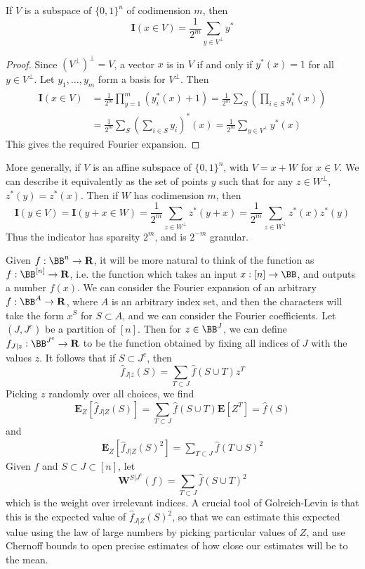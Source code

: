 \begin{theorem}
    If $V$ is a subspace of $\{ 0, 1 \}^n$ of codimension $m$, then
    \[ \mathbf{I}(x \in V) = \frac{1}{2^m} \sum_{y \in V^\perp} y^* \]
\end{theorem}
\begin{proof}
    Since $(V^\perp)^\perp = V$, a vector $x$ is in $V$ if and only if $y^*(x) = 1$ for all $y \in V^\perp$. Let $y_1, \dots, y_m$ form a basis for $V^\perp$. Then
    \begin{align*}
        \mathbf{I}(x \in V) &= \frac{1}{2^m} \prod_{y = 1}^m \left( y_i^*(x) + 1 \right) = \frac{1}{2^m} \sum_S \left( \prod_{i \in S} y_i^*(x) \right)\\
        &= \frac{1}{2^m} \sum_S \left( \sum_{i \in S} y_i \right)^*(x) = \frac{1}{2^m} \sum_{y \in V^\perp} y^*(x)
    \end{align*}
    This gives the required Fourier expansion.
\end{proof}

More generally, if $V$ is an affine subspace of $\{ 0, 1 \}^n$, with $V = x + W$ for $x \in V$. We can describe it equivalently as the set of points $y$ such that for any $z \in W^\perp$, $z^*(y) = z^*(x)$. Then if $W$ has codimension $m$, then
%
\[ \mathbf{I}(y \in V) = \mathbf{I}(y + x \in W) = \frac{1}{2^m} \sum_{z \in W^\perp} z^*(y + x) = \frac{1}{2^m} \sum_{z \in W^\perp} z^*(x) z^*(y) \]
%
Thus the indicator has sparsity $2^m$, and is $2^{-m}$ granular.

Given $f: \BB^n \to \mathbf{R}$, it will be more natural to think of the function as $f: \BB^{[n]} \to \mathbf{R}$, i.e. the function which takes an input $x: [n] \to \BB$, and outputs a number $f(x)$. We can consider the Fourier expansion of an arbitrary $f: \BB^A \to \mathbf{R}$, where $A$ is an arbitrary index set, and then the characters will take the form $x^S$ for $S \subset A$, and we can consider the Fourier coefficients. Let $(J,J^c)$ be a partition of $[n]$. Then for $z \in \BB^J$, we can define $f_{J|z}: \BB^{J^c} \to \mathbf{R}$ to be the function obtained by fixing all indices of $J$ with the values $z$. It follows that if $S \subset J^c$, then
%
\[ \widehat{f}_{J|z}(S) = \sum_{T \subset J} \widehat{f}(S \cup T) z^T \]
%
Picking $z$ randomly over all choices, we find
%
\[ \mathbf{E}_Z[\widehat{f}_{J|Z}(S)] = \sum_{T \subset J} \widehat{f}(S \cup T) \mathbf{E}[Z^T] = \widehat{f}(S) \]
%
and
%
\begin{align*}
    \mathbf{E}_Z[\widehat{f}_{J|Z}(S)^2] = \sum_{T \subset J} \widehat{f}(T \cup S)^2
\end{align*}
%
Given $f$ and $S \subset J \subset [n]$, let
%
\[ \mathbf{W}^{S|J^c}(f) = \sum_{T \subset J} \widehat{f}(S \cup T)^2 \]
%
which is the weight over irrelevant indices. A crucial tool of Golreich-Levin is that this is the expected value of $\widehat{f}_{J|Z}(S)^2$, so that we can estimate this expected value using the law of large numbers by picking particular values of $Z$, and use Chernoff bounds to open precise estimates of how close our estimates will be to the mean.




